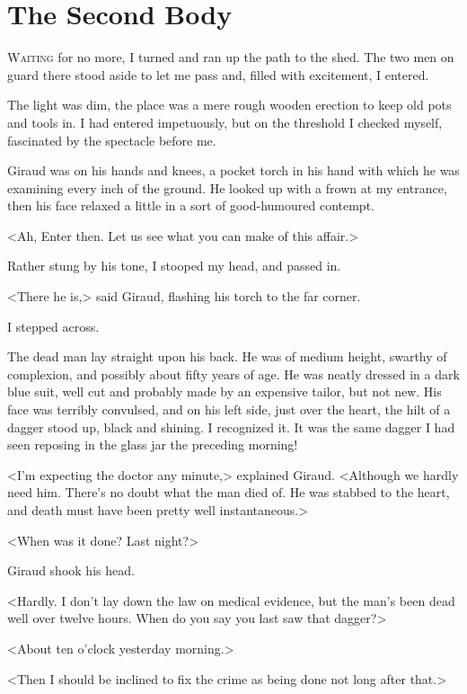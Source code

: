 \chapter{The Second Body}

\lettrine{W}{aiting} for no more, I turned and ran up the path to the shed. The two men on guard there stood aside to let me pass and, filled with excitement, I entered. 

\zz
 The light was dim, the place was a mere rough wooden erection to keep old pots and tools in. I had entered impetuously, but on the threshold I checked myself, fascinated by the spectacle before me. 

 Giraud was on his hands and knees, a pocket torch in his hand with which he was examining every inch of the ground. He looked up with a frown at my entrance, then his face relaxed a little in a sort of good-humoured contempt. 

 <Ah,  Enter then. Let us see what you can make of this affair.> 

 Rather stung by his tone, I stooped my head, and passed in. 

 <There he is,> said Giraud, flashing his torch to the far corner. 

 I stepped across. 

 The dead man lay straight upon his back. He was of medium height, swarthy of complexion, and possibly about fifty years of age. He was neatly dressed in a dark blue suit, well cut and probably made by an expensive tailor, but not new. His face was terribly convulsed, and on his left side, just over the heart, the hilt of a dagger stood up, black and shining. I recognized it. It was the same dagger I had seen reposing in the glass jar the preceding morning! 

 <I'm expecting the doctor any minute,> explained Giraud. <Although we hardly need him. There's no doubt what the man died of. He was stabbed to the heart, and death must have been pretty well instantaneous.> 

 <When was it done? Last night?> 

 Giraud shook his head. 

 <Hardly. I don't lay down the law on medical evidence, but the man's been dead well over twelve hours. When do you say you last saw that dagger?> 

 <About ten o'clock yesterday morning.> 

 <Then I should be inclined to fix the crime as being done not long after that.> 

